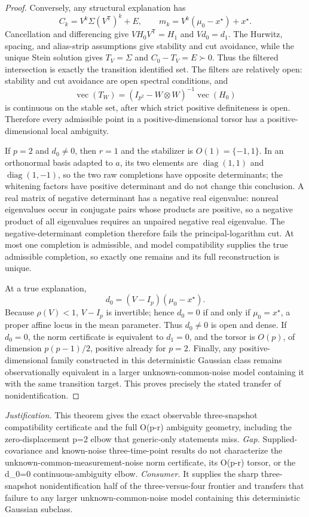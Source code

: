 \documentclass{article}
\begin{document}
\begin{proof}
Conversely, any structural explanation has
\[
 C_k=V^k\Sigma(V^{\mathsf T})^k+E,\qquad
 m_k=V^k(\mu_0-x^\star)+x^\star.
\]
Cancellation and differencing give \(VH_0V^{\mathsf T}=H_1\) and \(Vd_0=d_1\).  The Hurwitz, spacing, and alias-strip assumptions give stability and cut avoidance, while the unique Stein solution gives \(T_V=\Sigma\) and \(C_0-T_V=E\succ0\).  Thus the filtered intersection is exactly the transition identified set.  The filters are relatively open: stability and cut avoidance are open spectral conditions, and
\[
 \operatorname{vec}(T_W)=(I_{p^2}-W\otimes W)^{-1}\operatorname{vec}(H_0)
\]
is continuous on the stable set, after which strict positive definiteness is open.  Therefore every admissible point in a positive-dimensional torsor has a positive-dimensional local ambiguity.

If \(p=2\) and \(d_0\ne0\), then \(r=1\) and the stabilizer is \(O(1)=\{-1,1\}\).  In an orthonormal basis adapted to \(a\), its two elements are \(\operatorname{diag}(1,1)\) and \(\operatorname{diag}(1,-1)\), so the two raw completions have opposite determinants; the whitening factors have positive determinant and do not change this conclusion.  A real matrix of negative determinant has a negative real eigenvalue: nonreal eigenvalues occur in conjugate pairs whose products are positive, so a negative product of all eigenvalues requires an unpaired negative real eigenvalue.  The negative-determinant completion therefore fails the principal-logarithm cut.  At most one completion is admissible, and model compatibility supplies the true admissible completion, so exactly one remains and its full reconstruction is unique.

At a true explanation,
\[
 d_0=(V-I_p)(\mu_0-x^\star).
\]
Because \(\rho(V)<1\), \(V-I_p\) is invertible; hence \(d_0=0\) if and only if \(\mu_0=x^\star\), a proper affine locus in the mean parameter.  Thus \(d_0\ne0\) is open and dense.  If \(d_0=0\), the norm certificate is equivalent to \(d_1=0\), and the torsor is \(O(p)\), of dimension \(p(p-1)/2\), positive already for \(p=2\).  Finally, any positive-dimensional family constructed in this deterministic Gaussian class remains observationally equivalent in a larger unknown-common-noise model containing it with the same transition target.  This proves precisely the stated transfer of nonidentification.
\end{proof}
\par\smallskip\noindent \textit{Justification.} This theorem gives the exact observable three-snapshot compatibility certificate and the full O(p-r) ambiguity geometry, including the zero-displacement p=2 elbow that generic-only statements miss. \textit{Gap.} Supplied-covariance and known-noise three-time-point results do not characterize the unknown-common-measurement-noise norm certificate, its O(p-r) torsor, or the d\_0=0 continuous-ambiguity elbow. \textit{Consumer.} It supplies the sharp three-snapshot nonidentification half of the three-versus-four frontier and transfers that failure to any larger unknown-common-noise model containing this deterministic Gaussian subclass.
\end{document}

